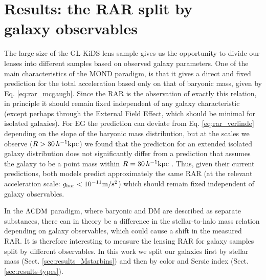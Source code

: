 \documentclass[usenatbib]{mnras}
\newcommand{\hkpc}{\, h^{-1}{\rm{kpc}} }
\newcommand{\mpss}{ {\rm m/s^2} }
\newcommand{\lcdm}{{\rm \Lambda CDM}}
\newcommand{\un}[1]{_{\rm #1}}
\begin{document}

\section{Results: the RAR split by \\ galaxy observables}
\label{sec:results-observables}

The large size of the GL-KiDS lens sample gives us the opportunity to divide our lenses into different samples based on observed galaxy parameters. One of the main characteristics of the MOND paradigm, is that it gives a direct and fixed prediction for the total acceleration based only on that of baryonic mass, given by Eq. \ref{eq:rar_mcgaugh}. Since the RAR is the observation of exactly this relation, in principle it should remain fixed independent of any galaxy characteristic (except perhaps through the External Field Effect, which should be minimal for isolated galaxies). For EG the prediction can deviate from Eq. \ref{eq:rar_verlinde} depending on the slope of the baryonic mass distribution, but at the scales we observe ($R>30\hkpc$) we found that the prediction for an extended isolated galaxy distribution does not significantly differ from a prediction that assumes the galaxy to be a point mass within $R=30\hkpc$ \cite[see Sect. 4.3 of][]{brouwer2017}. Thus, given their current predictions, both models predict approximately the same RAR (at the relevant acceleration scale: $g\un{bar}<10^{-11} \mpss$) which should remain fixed independent of galaxy observables.

In the $\lcdm$ paradigm, where baryonic and DM are described as separate substances, there can in theory be a difference in the stellar-to-halo mass relation depending on galaxy observables, which could cause a shift in the measured RAR. It is therefore interesting to measure the lensing RAR for galaxy samples split by different observables. In this work we split our galaxies first by stellar mass (Sect. \ref{sec:results_Mstarbins}) and then by color and Sersic index (Sect. \ref{sec:results-types}).
\end{document}
